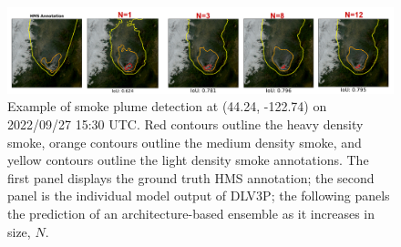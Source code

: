 \documentclass{article}
\begin{document}
\begin{figure}[h]
    \centering
    \includegraphics[width=\textwidth]{smoothing_ex.png}
    \caption{Example of smoke plume detection at (44.24, -122.74) on 2022/09/27 15:30 UTC. Red contours outline the heavy density smoke, orange contours outline the medium density smoke, and yellow contours outline the light density smoke annotations. The first panel displays the ground truth HMS annotation; the second panel is the individual model output of DLV3P; the following panels the prediction of an architecture-based ensemble as it increases in size, $N$.}
    \label{fig:smoothing_ex}
\end{figure}







\end{document}
